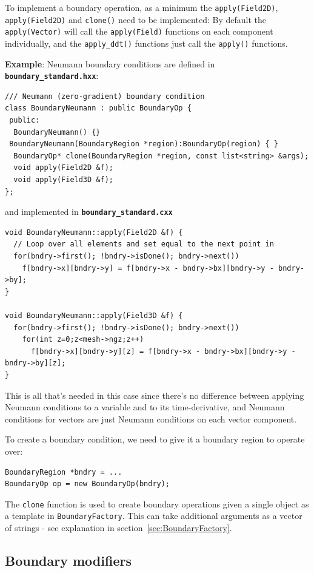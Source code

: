 \documentclass[12pt]{article}
\newcommand{\code}[1]{\texttt{#1}}
\newcommand{\file}[1]{\texttt{\bf #1}}
\begin{document}
To implement a boundary operation, as a minimum the \code{apply(Field2D)},
\code{apply(Field2D)} and \code{clone()} need to be implemented: By default
the \code{apply(Vector)} will call the \code{apply(Field)} functions on each
component individually, and the \code{apply\_ddt()} functions just call
the \code{apply()} functions.

{\bf Example}: Neumann boundary conditions are defined in
\file{boundary\_standard.hxx}:
\begin{lstlisting}[firstnumber=22]
/// Neumann (zero-gradient) boundary condition
class BoundaryNeumann : public BoundaryOp {
 public:
  BoundaryNeumann() {}
 BoundaryNeumann(BoundaryRegion *region):BoundaryOp(region) { }
  BoundaryOp* clone(BoundaryRegion *region, const list<string> &args);
  void apply(Field2D &f);
  void apply(Field3D &f);
};
\end{lstlisting}
and implemented in \file{boundary\_standard.cxx} 
\begin{lstlisting}[firstnumber=52]
void BoundaryNeumann::apply(Field2D &f) {
  // Loop over all elements and set equal to the next point in
  for(bndry->first(); !bndry->isDone(); bndry->next())
    f[bndry->x][bndry->y] = f[bndry->x - bndry->bx][bndry->y - bndry->by];
}

void BoundaryNeumann::apply(Field3D &f) {
  for(bndry->first(); !bndry->isDone(); bndry->next())
    for(int z=0;z<mesh->ngz;z++)
      f[bndry->x][bndry->y][z] = f[bndry->x - bndry->bx][bndry->y - bndry->by][z];
}
\end{lstlisting}
This is all that's needed in this case since there's no difference between
applying Neumann conditions to a variable and to its time-derivative,
and Neumann conditions for vectors are just Neumann conditions
on each vector component.

To create a boundary condition, we need to give it a boundary region
to operate over:
\begin{lstlisting}[numbers=none]
BoundaryRegion *bndry = ...
BoundaryOp op = new BoundaryOp(bndry);
\end{lstlisting}

The \code{clone} function is used to create
boundary operations given a single object as a template
in \code{BoundaryFactory}. This can take additional arguments
as a vector of strings - see explanation in section~\ref{sec:BoundaryFactory}.

\subsection{Boundary modifiers}
\end{document}
